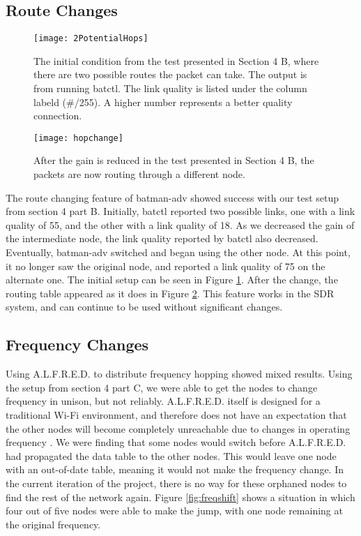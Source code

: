\subsection{Route Changes}

\begin{figure}
	\centering
	\texttt{[image: 2PotentialHops]}
	\caption{The initial condition from the test presented in Section 4 B, where there are two possible routes the packet can take. The output is from running batctl. The link quality is listed under the column labeld (\#/255). A higher number represents a better quality connection.}
	\label{fig:2Hops}
\end{figure}

\begin{figure}
	\centering
	\texttt{[image: hopchange]}
	\caption{After the gain is reduced in the test presented in Section 4 B, the packets are now routing through a different node.}
	\label{fig:NewHop}
\end{figure}

The route changing feature of batman-adv showed success with our test setup from section 4 part B. Initially, batctl reported two possible links, one with a link quality of 55, and the other with a link quality of 18. As we decreased the gain of the intermediate node, the link quality reported by batctl also decreased. Eventually, batman-adv switched and began using the other node. At this point, it no longer saw the original node, and reported a link quality of 75 on the alternate one. The initial setup can be seen in Figure \ref{fig:2Hops}. After the change, the routing table appeared as it does in Figure \ref{fig:NewHop}. This feature works in the SDR system, and can continue to be used without significant changes.  

\subsection{Frequency Changes}

Using A.L.F.R.E.D. to distribute frequency hopping showed mixed results. Using the setup from section 4 part C, we were able to get the nodes to change frequency in unison, but not reliably. A.L.F.R.E.D. itself is designed for a traditional Wi-Fi environment, and therefore does not have an expectation that the other nodes will become completely unreachable due to changes in operating frequency \cite{0015}. We were finding that some nodes would switch before A.L.F.R.E.D. had propagated the data table to the other nodes. This would leave one node with an out-of-date table, meaning it would not make the frequency change. In the current iteration of the project, there is no way for these orphaned nodes to find the rest of the network again. Figure \ref{fig:freqshift} shows a situation in which four out of five nodes were able to make the jump, with one node remaining at the original frequency.



